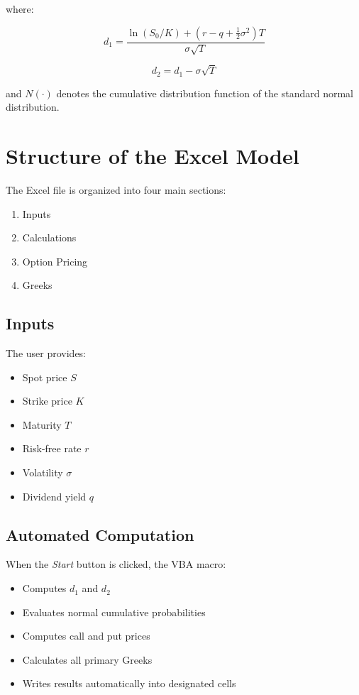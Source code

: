 \documentclass[12pt]{article}
\begin{document}
where:

\[
d_1 =
\frac{\ln(S_0/K) + (r - q + \frac{1}{2}\sigma^2)T}
{\sigma \sqrt{T}}
\]

\[
d_2 = d_1 - \sigma \sqrt{T}
\]

and $N(\cdot)$ denotes the cumulative distribution function of the standard normal distribution.

\section{Structure of the Excel Model}

The Excel file is organized into four main sections:

\begin{enumerate}
    \item Inputs
    \item Calculations
    \item Option Pricing
    \item Greeks
\end{enumerate}

\subsection*{Inputs}

The user provides:

\begin{itemize}
    \item Spot price $S$
    \item Strike price $K$
    \item Maturity $T$
    \item Risk-free rate $r$
    \item Volatility $\sigma$
    \item Dividend yield $q$
\end{itemize}

\subsection*{Automated Computation}

When the \textit{Start} button is clicked, the VBA macro:

\begin{itemize}
    \item Computes $d_1$ and $d_2$
    \item Evaluates normal cumulative probabilities
    \item Computes call and put prices
    \item Calculates all primary Greeks
    \item Writes results automatically into designated cells
\end{itemize}
\end{document}
